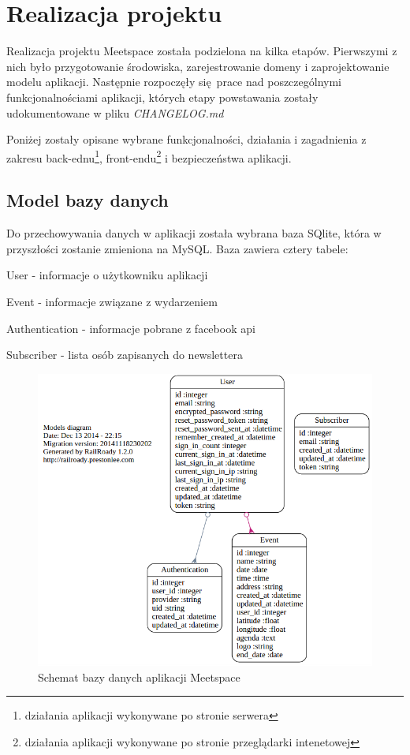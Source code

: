 \section{Realizacja projektu}
Realizacja projektu Meetspace została podzielona na kilka etapów. Pierwszymi z nich było przygotowanie środowiska, zarejestrowanie domeny i zaprojektowanie modelu aplikacji. Następnie rozpoczęły się prace nad poszczególnymi funkcjonalnościami aplikacji, których etapy powstawania zostały udokumentowane w pliku \emph{CHANGELOG.md}


Poniżej zostały opisane wybrane funkcjonalności, działania i zagadnienia z zakresu back-ednu\footnote{działania aplikacji wykonywane po stronie serwera}, front-endu\footnote{działania aplikacji wykonywane po stronie przeglądarki intenetowej} i bezpieczeństwa aplikacji.
  \clearpage
  \subsection{Model bazy danych}
    Do przechowywania danych w aplikacji została wybrana baza SQlite, która w przyszłości zostanie zmieniona na MySQL. Baza zawiera cztery tabele:
    \begin{itemizeReduced}
      \item User - informacje o użytkowniku aplikacji
      \item Event - informacje związane z wydarzeniem
      \item Authentication - informacje pobrane z facebook api
      \item Subscriber - lista osób zapisanych do newslettera
    \end{itemizeReduced}

    \begin{figure}[h]
      \centering
        \includegraphics[scale=0.55]{images/dbm.png}
      \caption{Schemat bazy danych aplikacji Meetspace}
    \end{figure}


